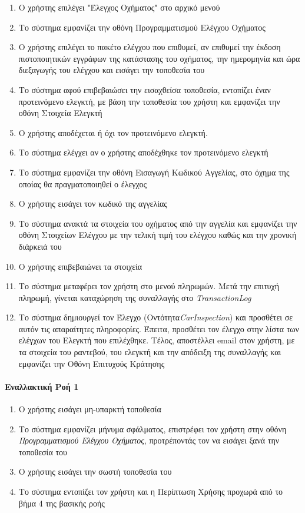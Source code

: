 \documentclass{../ol-softwaremanual}
\begin{document}
	\begin{enumerate}
		\item Ο χρήστης επιλέγει \en"\gr Έλεγχος Οχήματος\en" \gr στο αρχικό μενού
		\item Το σύστημα εμφανίζει την οθόνη Προγραμματισμού Ελέγχου Οχήματος
		\item Ο χρήστης επιλέγει το πακέτο ελέγχου που επιθυμεί, αν επιθυμεί την έκδοση πιστοποιητικών εγγράφων της κατάστασης του οχήματος, την ημερομηνία και ώρα διεξαγωγής του ελέγχου και εισάγει την τοποθεσία του
		\item Το σύστημα αφού επιβεβαιώσει την εισαχθείσα τοποθεσία, εντοπίζει έναν προτεινόμενο ελεγκτή, με βάση την τοποθεσία του χρήστη και εμφανίζει την οθόνη Στοιχεία Ελεγκτή
		\item Ο χρήστης αποδέχεται ή όχι τον προτεινόμενο ελεγκτή. 
		\item Το σύστημα ελέγχει αν ο χρήστης αποδέχθηκε τον προτεινόμενο ελεγκτή
		\item Το σύστημα εμφανίζει την οθόνη Εισαγωγή Κωδικού Αγγελίας, στο όχημα της οποίας θα πραγματοποιηθεί ο έλεγχος		
		\item Ο χρήστης εισάγει τον κωδικό της αγγελίας
		\item Το σύστημα ανακτά τα στοιχεία του οχήματος από την αγγελία και εμφανίζει την οθόνη Στοιχείων Ελέγχου με την τελική τιμή του ελέγχου καθώς και την χρονική διάρκειά του
		\item Ο χρήστης επιβεβαιώνει τα στοιχεία
		\item Το σύστημα μεταφέρει τον χρήστη στο μενού πληρωμών. Μετά την επιτυχή πληρωμή, γίνεται καταχώρηση της συναλλαγής στο \en \textit{TransactionLog} \gr
		\item Το σύστημα δημιουργεί τον Έλεγχο (Οντότητα\en \textit{CarInspection}\gr) και προσθέτει σε αυτόν τις απαραίτητες πληροφορίες. Έπειτα, προσθέτει τον έλεγχο στην λίστα των ελέγχων του Ελεγκτή που επιλέχθηκε. Τέλος,  αποστέλλει \en email \gr στον χρήστη, με τα στοιχεία του ραντεβού, του ελεγκτή και την απόδειξη της συναλλαγής και εμφανίζει την Οθόνη Επιτυχούς Κράτησης
	\end{enumerate}
	
	
	
	\paragraph{Εναλλακτική Ροή 1}
	
	\begin{enumerate}
		\item Ο χρήστης εισάγει μη-υπαρκτή τοποθεσία
		\item Το σύστημα εμφανίζει μήνυμα σφάλματος, επιστρέφει τον χρήστη στην οθόνη \textit{Προγραμματισμού Ελέγχου Οχήματος}, προτρέποντάς τον να εισάγει ξανά την τοποθεσία του
		\item Ο χρήστης εισάγει την σωστή τοποθεσία του
		\item Το σύστημα εντοπίζει τον χρήστη και η Περίπτωση Χρήσης προχωρά από το βήμα 4 της βασικής ροής
	\end{enumerate}
	
\end{document}
